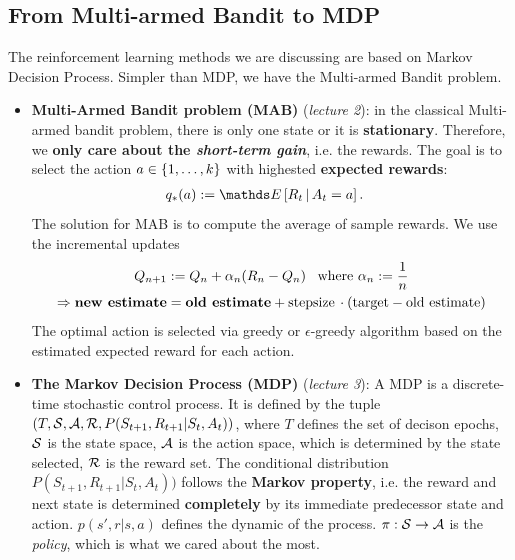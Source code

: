 \documentclass[11pt]{article}
\begin{document}
\subsection{From Multi-armed Bandit  to MDP}
The reinforcement learning methods we are discussing are based on Markov Decision Process. Simpler than MDP, we have the Multi-armed Bandit problem.
\begin{itemize}
\item \textbf{Multi-Armed Bandit problem (MAB)} (\emph{lecture 2}): in the classical Multi-armed bandit problem, there is only one state or it is \textbf{stationary}. Therefore, we \textbf{only care about the \emph{short-term gain}}, i.e. the rewards.  The goal is to select the action $a \in \left\{1,\ldots, k\right\}$ with highested \textbf{expected rewards}:
\begin{align*}
q_*(a) &:= \E{}{R_t \,|\, A_t = a}.
\end{align*} The solution for MAB is to compute the average of sample rewards. We use the incremental updates 
\begin{align}
Q_{n+1} &:= Q_{n} + \alpha_n(R_n - Q_n)\;\;\; \text{where }\alpha_n :=\frac{1}{n} \label{eqn: increment_update}\\
\Rightarrow \text{\textbf{new estimate}}&=\text{\textbf{old estimate}} + \text{stepsize}\,\cdot (\text{target} - \text{old estimate}) \nonumber
\end{align} The optimal action is selected via greedy or $\epsilon$-greedy algorithm based on the estimated expected reward for each action. 



\item  \textbf{The Markov Decision Process (MDP)} (\emph{lecture 3}): A MDP is a discrete-time stochastic control process. It is defined by the tuple \underline{$(T, {\mathcal S}, {\mathcal A}, {\mathcal R}, P(S_{t+1}, R_{t+1} | S_{t}, A_{t}))$}, where $T$ defines the set of decison epochs,  ${\mathcal S}$ is the state space,  ${\mathcal A}$ is the action space, which is determined by the state selected, ${\mathcal R}$ is the reward set. The conditional distribution $P(S_{t+1}, R_{t+1} | S_{t}, A_{t}))$ follows the \textbf{Markov property}, i.e.  the reward and next state is determined \textbf{completely} by its immediate predecessor state and action. $p(s', r| s, a)$ defines the dynamic of the process. $\pi: {\mathcal S} \rightarrow {\mathcal A}$ is the \emph{policy}, which is what we cared about the most. 


\end{itemize}
\end{document}
